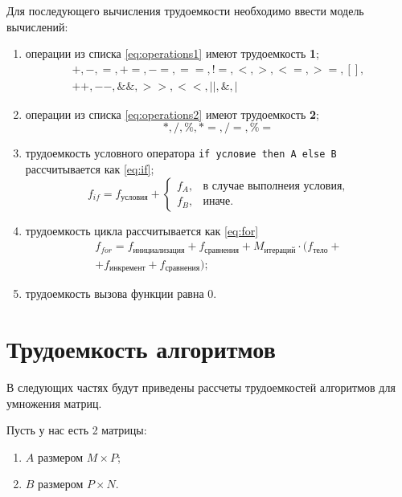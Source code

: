 Для последующего вычисления трудоемкости необходимо ввести модель вычислений:

\begin{enumerate}
	\item операции из списка \ref{eq:operations1} имеют трудоемкость \textbf{1};
	\begin{equation}
		\label{eq:operations1}
		\begin{gathered}
			+, -, =, +=, -=, ==, !=, <, >, <=, >=, [], \\ ++, --, \&\&, >>, <<, ||, \&, |
		\end{gathered}
	\end{equation}
	\item операции из списка \ref{eq:operations2} имеют трудоемкость \textbf{2};
	\begin{equation}
		\label{eq:operations2}
		*, /, \%, *=, /=, \%=
	\end{equation}
	\item трудоемкость условного оператора \texttt{if условие then A else B} рассчитывается как \ref{eq:if};
	\begin{equation}
		\label{eq:if}
		f_{if} = f_{\text{условия}} + 
		\begin{cases}
			f_{A}, & \text{в случае выполнеия условия,}\\
			f_{B}, & \text{иначе}.
		\end{cases}
	\end{equation}
	\item трудоемкость цикла рассчитывается как \ref{eq:for}
	\begin{equation}
		\label{eq:for}
		\begin{gathered}
			f_{for} = f_{\text{инициализация}} + f_{\text{сравнения}} + M_{\text{итераций}} \cdot (f_{\text{тело}} +\\
			+ f_{\text{инкремент}} + f_{\text{сравнения}});
		\end{gathered}
	\end{equation}
	\item трудоемкость вызова функции равна 0.
\end{enumerate}

\section{Трудоемкость алгоритмов}
В следующих частях будут приведены рассчеты трудоемкостей алгоритмов для умножения матриц.

Пусть у нас есть 2 матрицы: 
\begin{enumerate}
	\item $A$ размером $M \times P$;
	\item $B$ размером $P \times N$.
\end{enumerate}

